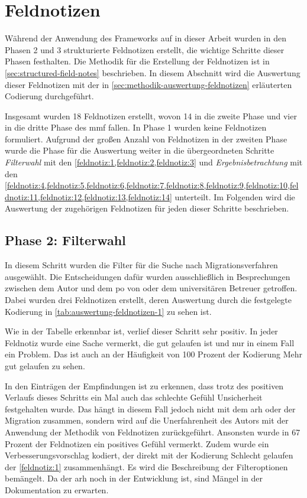 \section{Feldnotizen}
\label{sec:auswertung-feldnotizen}

Während der Anwendung des Frameworks auf \jf in dieser Arbeit wurden in den Phasen 2 und 3 strukturierte Feldnotizen erstellt, die wichtige Schritte dieser Phasen festhalten.
Die Methodik für die Erstellung der Feldnotizen ist in \cref{sec:structured-field-notes} beschrieben.
In diesem Abschnitt wird die Auswertung dieser Feldnotizen mit der in \cref{sec:methodik-auswertung-feldnotizen} erläuterten Codierung  durchgeführt.

Insgesamt wurden 18 Feldnotizen erstellt, wovon 14 in die zweite Phase und vier in die dritte Phase des \gls{mmf} fallen.
In Phase 1 wurden keine Feldnotizen formuliert.
Aufgrund der großen Anzahl von Feldnotizen in der zweiten Phase wurde die Phase für die Auswertung weiter in die übergeordneten Schritte \emph{Filterwahl} mit den \cref{feldnotiz:1,feldnotiz:2,feldnotiz:3} und \emph{Ergebnisbetrachtung} mit den \cref{feldnotiz:4,feldnotiz:5,feldnotiz:6,feldnotiz:7,feldnotiz:8,feldnotiz:9,feldnotiz:10,feldnotiz:11,feldnotiz:12,feldnotiz:13,feldnotiz:14} unterteilt.
Im Folgenden wird die Auswertung der zugehörigen Feldnotizen für jeden dieser Schritte beschrieben.

\subsection{Phase 2: Filterwahl}

In diesem Schritt wurden die Filter für die Suche nach Migrationsverfahren ausgewählt.
Die Entscheidungen dafür wurden ausschließlich in Besprechungen zwischen dem Autor und dem \gls{po} von \jf oder dem universitären Betreuer getroffen.
Dabei wurden drei Feldnotizen erstellt, deren Auswertung durch die festgelegte Kodierung in \cref{tab:auswertung-feldnotizen-1} zu sehen ist.



Wie in der Tabelle erkennbar ist, verlief dieser Schritt sehr positiv.
In jeder Feldnotiz wurde eine Sache vermerkt, die gut gelaufen ist und nur in einem Fall ein Problem.
Das ist auch an der Häufigkeit von 100 Prozent der Kodierung \glqq Mehr gut gelaufen\grqq{} zu sehen.

In den Einträgen der Empfindungen ist zu erkennen, dass trotz des positiven Verlaufs dieses Schritts ein Mal auch das schlechte Gefühl \glqq Unsicherheit\grqq{} festgehalten wurde.
Das hängt in diesem Fall jedoch nicht mit dem \gls{arh} oder der Migration zusammen, sondern wird auf die Unerfahrenheit des Autors mit der Anwendung der Methodik von Feldnotizen zurückgeführt.
Ansonsten wurde in 67 Prozent der Feldnotizen ein positives Gefühl vermerkt.
Zudem wurde ein Verbesserungsvorschlag kodiert, der direkt mit der Kodierung \glqq Schlecht gelaufen\grqq{} der \cref{feldnotiz:1} zusammenhängt.
Es wird die Beschreibung der Filteroptionen bemängelt.
Da der \gls{arh} noch in der Entwicklung ist, sind Mängel in der Dokumentation zu erwarten.

